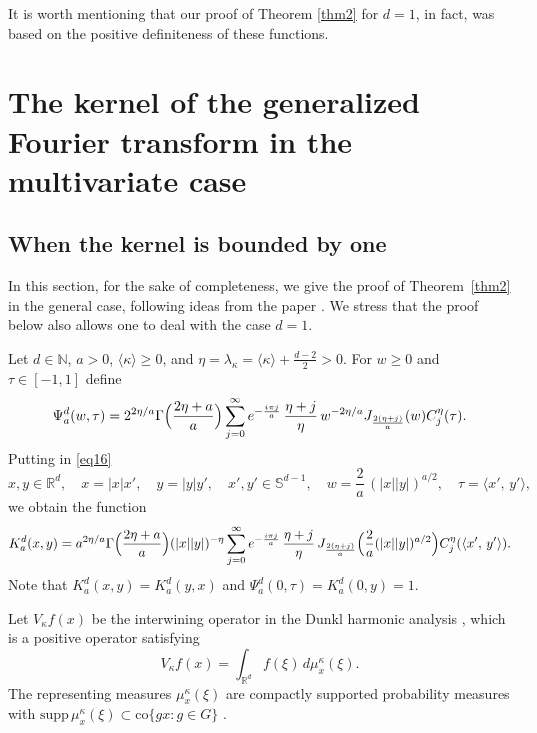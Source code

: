 \documentclass[12pt,twoside,reqno]{amsart}\usepackage[cp1251]{inputenc}
\theoremstyle{plain}
\theoremstyle{remark}
\begin{document}
It is worth mentioning that  our proof of Theorem \ref{thm2} for $d=1$, in fact,  was
based on the positive definiteness of these functions.

\vspace{0.6mm}

\section{The kernel of the generalized Fourier transform in the multivariate case}%

\subsection{When  the kernel is bounded by one}\label{subsec4-1}
In this section,
for the sake of completeness,
 we give the proof of Theorem~\ref{thm2} in the general case, following ideas from the paper \cite{CBL18}.
We stress that the proof below also allows one to deal with the case $d=1$.



Let $d\in\mathbb{N}$, $a>0$,  $\langle\kappa\rangle\ge 0$,
and $\eta=\lambda_{\kappa}=\langle\kappa\rangle+\frac{d-2}{2}>0$.
For $w\ge 0$ and $\tau\in [-1,1]$ define
\begin{equation}\label{eq16}
\Psi_{a}^d(w,\tau)=2^{2\eta/a}\Gamma\Bigl(\frac{2\eta+a}{a}\Bigr)\sum_{j=0}^{\infty}e^{-\frac{i\pi j}{a}}\,\frac{\eta+j}{\eta}\,w^{-2\eta/a}J_{\frac{2(\eta+j)}{a}}(w)C_{j}^{\eta}(\tau).
\end{equation}
Putting in \eqref{eq16}
\[
x,y\in\mathbb{R}^d,\quad x=|x|x',\quad y=|y|y',\quad x',y'\in\mathbb{S}^{d-1},\quad w=\frac{2}{a}\,(|x||y|)^{a/2},\quad \tau=\langle x',\,y'\rangle,
\]
we obtain the function
\begin{equation*}
K_{a}^d(x,y)=a^{2\eta/a}\Gamma\Bigl(\frac{2\eta+a}{a}\Bigr)(|x||y|)^{-\eta}\sum_{j=0}^{\infty}e^{-\frac{i\pi j}{a}}\,\frac{\eta+j}{\eta}\,J_{\frac{2(\eta+j)}{a}}\Bigl(\frac{2}{a}(|x||y|)^{a/2}\Bigr)C_{j}^{\eta}(\langle x',\,y'\rangle).
\end{equation*}
Note that $K_{a}^d(x,y)=K_{a}^d(y,x)$ and $\Psi_{a}^d(0,\tau)=K_{a}^d(0,y)=1$.


Let $V_{\kappa}f(x)$ be the interwining operator in the Dunkl harmonic analysis \cite{Ro02}, which is a positive operator satisfying
\[
V_{\kappa}f(x)=\int_{\mathbb{R}^d}f(\xi)\,d\mu_{x}^{\kappa}(\xi).
\]
The representing measures $\mu_{x}^{\kappa}(\xi)$ are compactly supported probability
measures with $\text{supp}\,\mu_{x}^{\kappa}(\xi)\subset\text{co}{}\{gx\colon g\in G\}$
\cite{Ro99}.
\end{document}
